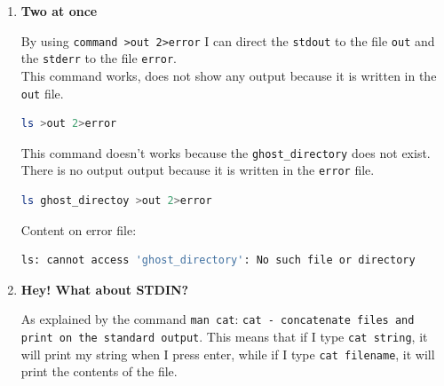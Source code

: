 \documentclass[9pt]{article}
\begin{document}
\begin{enumerate}
	\item \textbf{Two at once}
	
		By using \texttt{command >out 2>error} I can direct the \texttt{stdout} to the file \texttt{out} and the \texttt{stderr} to the file \texttt{error}.\\
		This command works, does not show any output because it is written in the \texttt{out} file.
		\begin{lstlisting}[language=bash]
ls >out 2>error
		\end{lstlisting}
		This command doesn't works because the \texttt{ghost\_directory} does not exist.
		There is no output output because it is written in the \texttt{error} file.
		\begin{lstlisting}[language=bash]
ls ghost_directoy >out 2>error
		\end{lstlisting}
		Content on error file:
		\begin{lstlisting}[language=bash]
ls: cannot access 'ghost_directory': No such file or directory
		\end{lstlisting}
		
	\item \textbf{Hey! What about STDIN?}
	
		As explained by the command \texttt{man cat}: \texttt{cat - concatenate files and print on the standard output}.
		This means that if I type \texttt{cat string}, it will print my string when I press enter, while if I type \texttt{cat filename}, it will print the contents of the file.
	
\end{enumerate}
\end{document}

